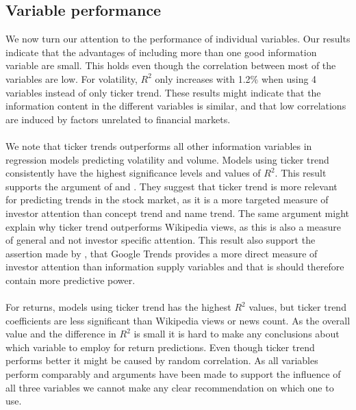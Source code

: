\subsection{Variable performance}
We now turn our attention to the performance of individual variables. Our results indicate that the advantages of including more than one good information variable are small. This holds even though the correlation between most of the variables are low. For volatility, $R^2$ only increases with 1.2\% when using 4 variables instead of only ticker trend. These results might indicate that the information content in the different variables is similar, and that low correlations are induced by factors unrelated to financial markets. 
\\\\
We note that ticker trends outperforms all other information variables in regression models predicting volatility and volume. Models using ticker trend consistently have the highest significance levels and values of $R^2$. This result supports the argument of \cite{engelberg} and \cite{joseph}. They suggest that ticker trend is more relevant for predicting trends in the stock market, as it is a more targeted measure of investor attention than concept trend and name trend. The same argument might explain why ticker trend outperforms Wikipedia views, as this is also a measure of general and not investor specific attention. This result also support the assertion made by \cite{engelberg}, that Google Trends provides a more direct measure of investor attention than information supply variables and that is should therefore contain more predictive power. 
\\\\
For returns, models using ticker trend has the highest $R^2$ values, but ticker trend coefficients are less significant than Wikipedia views or news count. As the overall value and the difference in $R^2$ is small it is hard to make any conclusions about which variable to employ for return predictions. Even though ticker trend performs better it might be caused by random correlation. As all variables perform comparably and arguments have been made to support the influence of all three variables we cannot make any clear recommendation on which one to use. 
\\\\
